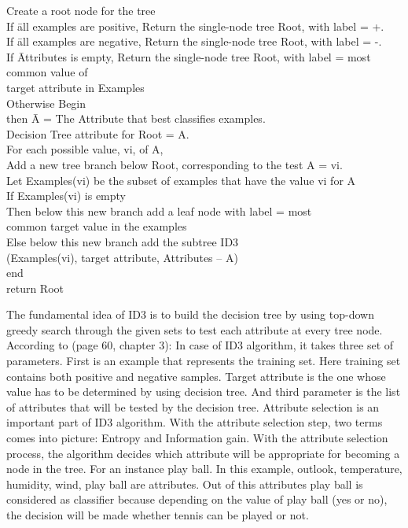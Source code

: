 \documentclass{report}
\begin{document}
\begin{tabbing}
Create a root node for the tree\\
If \= all examples are positive, Return the single-node tree Root, with label = +.\\
If \= all examples are negative, Return the single-node tree Root, with label = -.\\
If \= Attributes is empty, Return the single-node tree Root, with label = most common value of\\ target attribute in Examples\\
Otherwise Begin \\
\> then \=  A = The Attribute that best classifies examples.\\
\> Decision Tree attribute for Root = A.\\
\> For each possible value, vi, of A,\\
\> \> Add a new tree branch below Root, corresponding to the test A = vi.\\
\> \> Let Examples(vi) be the subset of examples that have the value vi for A\\
\> \> If Examples(vi) is empty\\
\> \> Then below this new branch add a leaf node with label = most\\
\> \> common target value in the examples\\
\> \> Else below this new branch add the subtree ID3 \\
\> \> (Examples(vi), target attribute, Attributes – {A})\\

end\\
return Root\\
\end{tabbing}

The fundamental idea of ID3 is to build the decision tree by using top-down greedy search through the given sets to test each attribute at every tree node.
According to \cite{Mitchell1997MachineLearning}(page 60, chapter 3): In case of ID3 algorithm, it takes three set of parameters.
First is an example that represents the training set. Here training set contains both positive and negative samples. Target attribute is the one whose value has to be determined by using decision tree. And third parameter is the list of attributes that will be tested by the decision tree. Attribute selection is an important part of ID3 algorithm. With the attribute selection step, two terms comes into picture: Entropy and Information gain. With the attribute selection process, the algorithm decides which attribute will be appropriate for becoming a node in the tree.
For an instance play ball. In this example, outlook, temperature, humidity, wind, play ball are attributes. Out of this attributes play ball is considered as classifier because depending on the value of play ball (yes or no), the decision will be made whether tennis can be played or not.
\end{document}
